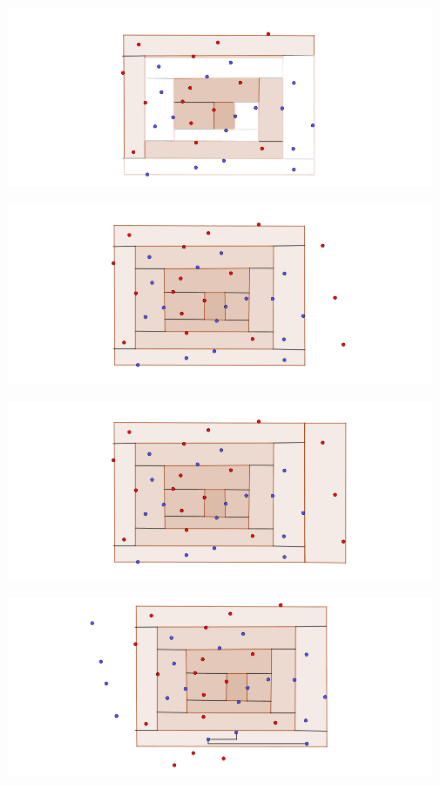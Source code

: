 \documentclass{beamer}
\begin{document}
\begin{frame}
\begin{figure}[h]
\includegraphics[width=\textwidth]{Construccion-poligono-2-alternancia-2}
\end{figure}
\end{frame}
\begin{frame}
\begin{figure}[h]
\includegraphics[width=\textwidth]{Construccion-poligono-2-alternancia-3}
\end{figure}
\end{frame}
\begin{frame}
\begin{figure}[h]
\includegraphics[width=\textwidth]{Construccion-poligono-2-alternancia-4}
\end{figure}
\end{frame}
\begin{frame}
\begin{figure}[h]
\includegraphics[width=\textwidth]{Construccion-poligono-2-alternancia-deco}
\end{figure}
\end{frame}
\end{document}
